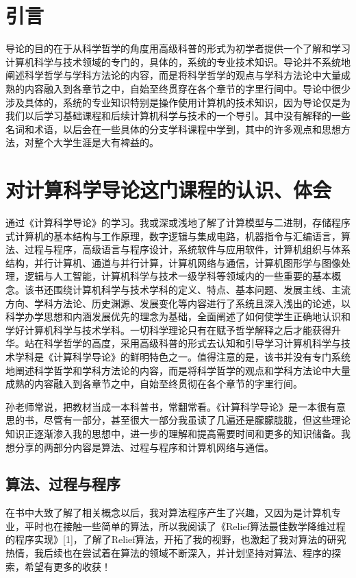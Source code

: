 \documentclass{article}
\begin{document}
\thispagestyle{empty}
\newpage
\setcounter{page}{1}
\section{引言}
导论的目的在于从科学哲学的角度用高级科普的形式为初学者提供一个了解和学习计算机科学与技术领域的专门的，具体的，系统的专业技术知识。导论并不系统地阐述科学哲学与学科方法论的内容，而是将科学哲学的观点与学科方法论中大量成熟的内容融入到各章节之中，自始至终贯穿在各个章节的字里行间中。导论中很少涉及具体的，系统的专业知识特别是操作使用计算机的技术知识，因为导论仅是为我们以后学习基础课程和后续计算机科学与技术的一个导引。其中没有解释的一些名词和术语，以后会在一些具体的分支学科课程中学到，其中的许多观点和思想方法，对整个大学生涯是大有裨益的。
\section{对计算科学导论这门课程的认识、体会}
通过《计算科学导论》的学习。我或深或浅地了解了计算模型与二进制，存储程序式计算机的基本结构与工作原理，数字逻辑与集成电路，机器指令与汇编语言，算法、过程与程序，高级语言与程序设计，系统软件与应用软件，计算机组织与体系结构，并行计算机、通道与并行计算，计算机网络与通信，计算机图形学与图像处理，逻辑与人工智能，计算机科学与技术一级学科等领域内的一些重要的基本概念。该书还围绕计算机科学与技术学科的定义、特点、基本问题、发展主线、主流方向、学科方法论、历史渊源、发展变化等内容进行了系统且深入浅出的论述，以科学办学思想和内涵发展优先的理念为基础，全面阐述了如何使学生正确地认识和学好计算机科学与技术学科。一切科学理论只有在赋予哲学解释之后才能获得升华。站在科学哲学的高度，采用高级科普的形式去认知和引导学习计算机科学与技术学科是《计算科学导论》的鲜明特色之一。值得注意的是，该书并没有专门系统地阐述科学哲学和学科方法论的内容，而是将科学哲学的观点和学科方法论中大量成熟的内容融入到各章节之中，自始至终贯彻在各个章节的字里行间。\par
孙老师常说，把教材当成一本科普书，常翻常看。《计算科学导论》是一本很有意思的书，尽管有一部分，甚至很大一部分我虽读了几遍还是朦朦胧胧，但这些理论知识正逐渐渗入我的思想中，进一步的理解和提高需要时间和更多的知识储备。我想分享的两部分内容是算法、过程与程序和计算机网络与通信。
\par

\subsection{算法、过程与程序}
在书中大致了解了相关概念以后，我对算法程序产生了兴趣，又因为是计算机专业，平时也在接触一些简单的算法，所以我阅读了《Relief算法最佳数学降维过程的程序实现》[1]，了解了Relief算法，开拓了我的视野，也激起了我对算法的研究热情，我后续也在尝试着在算法的领域不断深入，并计划坚持对算法、程序的探索，希望有更多的收获！
\end{document}

